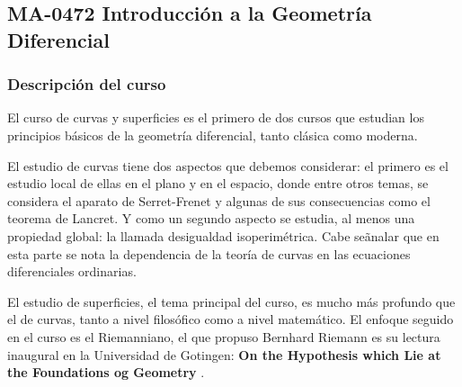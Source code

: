 
\newpage
\subsection*{MA-0472 Introducción a la Geometría Diferencial}

\begin{refsection}
\begin{table}[H]
\end{table}



\subsubsection*{Descripción del curso}

El curso de curvas y superficies es el primero de dos cursos que  estudian los principios b\'asicos de la geometr\'{i}a diferencial, tanto cl\'asica como moderna.  

El estudio de curvas tiene dos aspectos que debemos considerar: el primero es el estudio local de ellas en el plano y en el espacio, donde  entre otros temas, se considera el aparato de Serret-Frenet y algunas de sus consecuencias como el teorema de Lancret. Y como un segundo aspecto se estudia, al menos una propiedad global: la llamada desigualdad isoperim\'etrica.  Cabe se\~analar que en esta parte se nota la dependencia de la teor\'{i}a de curvas en las ecuaciones diferenciales ordinarias.

El estudio de superficies, el tema principal del curso, es mucho m\'as profundo que el de curvas, tanto a nivel filos\'ofico como a nivel matem\'atico. El enfoque seguido en el curso es el Riemanniano, el que propuso Bernhard Riemann es su lectura inaugural en la Universidad de Gotingen: {\bf On the Hypothesis which Lie at the Foundations og Geometry  }. 




\end{refsection}
